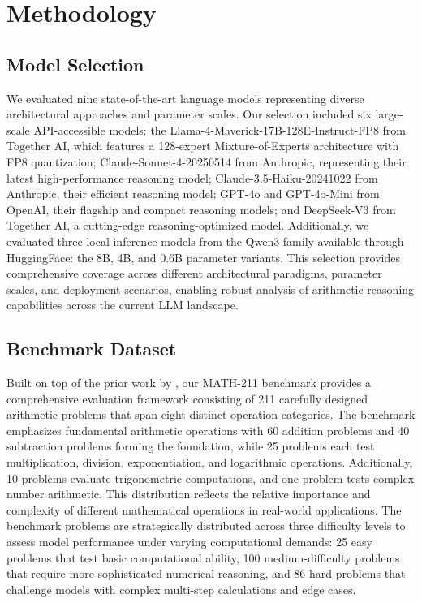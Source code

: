 \documentclass{article}
\begin{document}
\section{Methodology}

\subsection{Model Selection}

We evaluated nine state-of-the-art language models representing diverse architectural approaches and parameter scales. Our selection included six large-scale API-accessible models: the Llama-4-Maverick-17B-128E-Instruct-FP8 from Together AI, which features a 128-expert Mixture-of-Experts architecture with FP8 quantization; Claude-Sonnet-4-20250514 from Anthropic, representing their latest high-performance reasoning model; Claude-3.5-Haiku-20241022 from Anthropic, their efficient reasoning model; GPT-4o and GPT-4o-Mini from OpenAI, their flagship and compact reasoning models; and DeepSeek-V3 from Together AI, a cutting-edge reasoning-optimized model. Additionally, we evaluated three local inference models from the Qwen3 family available through HuggingFace: the 8B, 4B, and 0.6B parameter variants. This selection provides comprehensive coverage across different architectural paradigms, parameter scales, and deployment scenarios, enabling robust analysis of arithmetic reasoning capabilities across the current LLM landscape.

\subsection{Benchmark Dataset}

Built on top of the prior work by \citep{yuan2023arithmetic}, our MATH-211 benchmark provides a comprehensive evaluation framework consisting of 211 carefully designed arithmetic problems that span eight distinct operation categories. The benchmark emphasizes fundamental arithmetic operations with 60 addition problems and 40 subtraction problems forming the foundation, while 25 problems each test multiplication, division, exponentiation, and logarithmic operations. Additionally, 10 problems evaluate trigonometric computations, and one problem tests complex number arithmetic. This distribution reflects the relative importance and complexity of different mathematical operations in real-world applications. The benchmark problems are strategically distributed across three difficulty levels to assess model performance under varying computational demands: 25 easy problems that test basic computational ability, 100 medium-difficulty problems that require more sophisticated numerical reasoning, and 86 hard problems that challenge models with complex multi-step calculations and edge cases.
\end{document}
